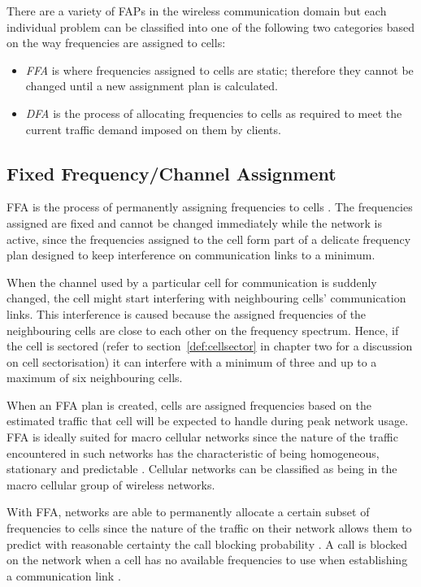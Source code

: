 There are a variety of \gls{FAP}s in the wireless communication domain but each individual problem can be classified into one of the following two categories based on the way frequencies are assigned to cells:
\begin{itemize}
  \item \emph{\gls{FFA}} is where frequencies assigned to cells are static; therefore they cannot be changed until a new assignment plan is calculated\cite{PrinciplesMobileCommunication}.
\item \emph{\gls{DFA}} is the process of allocating frequencies to cells as required to meet the current traffic demand imposed on them by clients\cite{PrinciplesMobileCommunication}. 
\end{itemize}

\subsection{Fixed Frequency/Channel Assignment}
\gls{FFA} is the process of permanently assigning frequencies to cells \cite{PrinciplesMobileCommunication}. The frequencies assigned are fixed and cannot be changed immediately while the network is active, since the frequencies assigned to the cell form part of a delicate frequency plan designed to keep interference on communication links to a minimum\cite{PrinciplesMobileCommunication}. 

When the channel used by a particular cell for communication is suddenly changed, the cell might start interfering with neighbouring cells' communication links. This interference is caused because the assigned frequencies of the neighbouring cells are close to each other on the frequency spectrum. Hence, if the cell is sectored (refer to section~\ref{def:cellsector} in chapter two for a discussion on cell sectorisation) it can interfere with a minimum of three and up to a maximum of six neighbouring cells\cite{PrinciplesMobileCommunication}.

When an \gls{FFA} plan is created, cells are assigned frequencies based on the estimated traffic that cell will be expected to handle during peak network usage. \gls{FFA} is ideally suited for macro cellular networks since the nature of the traffic encountered in such networks has the characteristic of being homogeneous, stationary and predictable \cite{PrinciplesMobileCommunication}. Cellular networks can be classified as being in the macro cellular group of wireless networks.

With \gls{FFA}, networks are able to permanently allocate a certain subset of frequencies to cells since the nature of the traffic on their network allows them to predict with reasonable certainty the call blocking probability \cite{PrinciplesMobileCommunication}. A call is blocked on the network when a cell has no available frequencies to use when establishing a communication link \cite{PrinciplesMobileCommunication}.

